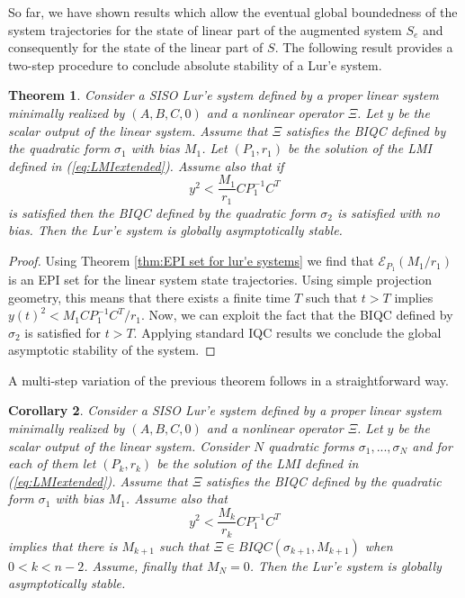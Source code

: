 \documentclass[letterpaper,10pt,conference,twocolumn]{IEEEtran}
\newtheorem{thm}{Theorem}[section]
\newtheorem{cor}[thm]{Corollary}
\newcommand{\Csi}{\Xi}
\newcommand{\ellips}{\mathcal{E}}
\begin{document}
So far, we have shown results which allow the eventual global boundedness of the system trajectories for the state of linear part of the augmented system $S_e$ and consequently for the state of the linear part of $S$. The following result provides a two-step procedure to conclude absolute stability of a Lur'e system.
\begin{thm}\label{thm:2step-bottle}
	Consider a SISO Lur'e system defined by a proper linear system minimally realized by $(A,B,C,0)$ and a nonlinear operator $\Csi$. Let $y$ be the scalar output of the linear system. Assume that $\Csi$ satisfies the BIQC defined by the quadratic form $\sigma_1$ with bias $M_1$. Let $(P_1,r_1)$ be the solution of the LMI defined in (\ref{eq:LMIextended}). Assume also that if
	\begin{equation*}
		y^2<\frac{M_1}{r_1} C P_1^{-1} C^T
	\end{equation*}
	is satisfied then the BIQC defined by the quadratic form $\sigma_2$ is satisfied with no bias. Then the Lur'e system is globally asymptotically stable.
\end{thm}
\begin{proof}
	Using Theorem \ref{thm:EPI set for lur'e systems} we find that $\ellips_{P_1}(M_1/r_1)$ is an EPI set for the linear system state trajectories. Using simple projection geometry, this means that there exists a finite time $T$ such that $t>T$ implies $y(t)^2<M_1 C P_1^{-1} C^T/r_1$. Now, we can exploit the fact that the BIQC defined by $\sigma_2$ is satisfied for $t>T$. Applying standard IQC results we conclude the global asymptotic stability of the system.
\end{proof}
A multi-step variation of the previous theorem follows in a straightforward way.
\begin{cor}\label{thm:multistep-bottle}
	Consider a SISO Lur'e system defined by a proper linear system minimally realized by $(A,B,C,0)$ and a nonlinear operator $\Csi$. Let $y$ be the scalar output of the linear system.
	Consider $N$ quadratic forms $\sigma_1, ..., \sigma_N$ and for each of them let $(P_k,r_k)$ be the solution of the LMI defined in (\ref{eq:LMIextended}).
	Assume that $\Csi$ satisfies the BIQC defined by the quadratic form $\sigma_1$ with bias $M_1$. 
	Assume also that
	\begin{equation*}
		y^2<\frac{M_k}{r_k} C P_1^{-1} C^T
	\end{equation*}
	implies that there is $M_{k+1}$ such that $\Xi\in BIQC(\sigma_{k+1},M_{k+1})$ when $0<k<n-2$.  Assume, finally that $M_N=0$.
	Then the Lur'e system is globally asymptotically stable.
\end{cor}
\end{document}
